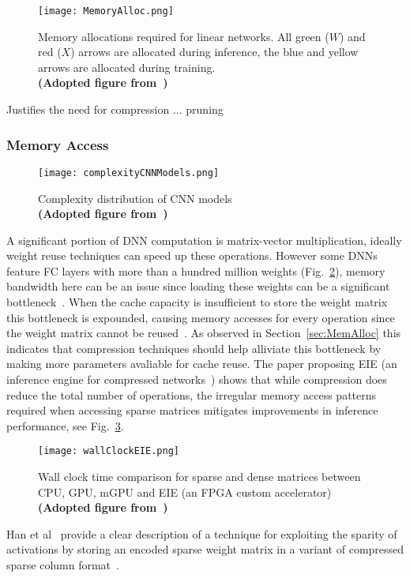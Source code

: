 \documentclass[../../D1.tex]{subfiles}
\begin{document}
\begin{figure}[H]
    \texttt{[image: MemoryAlloc.png]} 
    \caption{Memory allocations required for linear networks. All green ($W$) and red ($X$) arrows are allocated during inference, the blue and yellow arrows are allocated during training.\\ \textbf{(Adopted figure from~\autocite{rhuVDNNVirtualizedDeep2016})}}
    \label{fig:memAllocInf}   
\end{figure}


Justifies the need for compression ... pruning


\subsubsection{Memory Access}

\begin{figure}[H]
    \begin{center}
        \texttt{[image: complexityCNNModels.png]} 
    \end{center}
    
    \caption{Complexity distribution of CNN models\\ \textbf{(Adopted figure from~\autocite{qiuGoingDeeperEmbedded2016})}}
    \label{fig:CNNcomplexity}   
\end{figure}

A significant portion of DNN computation is matrix-vector multiplication, ideally weight reuse techniques can speed up these operations.
However some DNNs feature FC layers with more than a hundred million weights (Fig.~\ref{fig:CNNcomplexity}), memory bandwidth here can be an issue since loading these weights can be a significant bottleneck~\autocite{qiuGoingDeeperEmbedded2016}. 
When the cache capacity is insufficient to store the weight matrix this bottleneck is expounded, causing memory accesses for every operation since the weight matrix cannot be reused~\autocite{hanEIEEfficientInference2016}.
As observed in Section~\ref{sec:MemAlloc} this indicates that compression techniques should help alliviate this bottleneck by making more parameters avaliable for cache reuse. The paper proposing EIE (an inference engine for compressed networks~\autocite{hanEIEEfficientInference2016}) shows that while compression does reduce the total number of operations, the irregular memory access patterns required when accessing sparse matrices mitigates improvements in inference performance, see Fig.~\ref{fig:wallClockEIE}.

\begin{figure}[H]
    \texttt{[image: wallClockEIE.png]} 
    \caption{Wall clock time comparison for sparse and dense matrices between CPU, GPU, mGPU and EIE (an FPGA custom accelerator)\\ \textbf{(Adopted figure from~\autocite{hanEIEEfficientInference2016})}}
    \label{fig:wallClockEIE}   
\end{figure}

 Han et al~\autocite{hanEIEEfficientInference2016} provide a clear description of a technique for exploiting the sparity of activations by storing an encoded sparse weight matrix in a variant of compressed sparse column format~\autocite{vuducAutomaticPerformanceTuning}.
\end{document}
